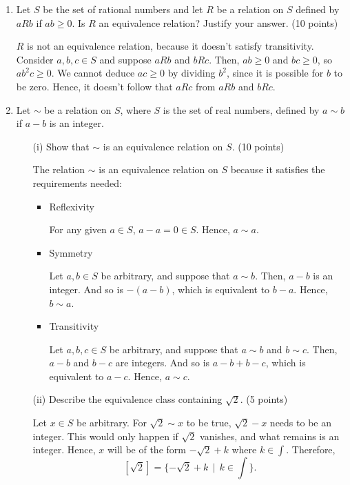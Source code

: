\begin{enumerate}
    \item Let \(S\) be the set of rational numbers and let \(R\) be a relation on \(S\) defined by \(aRb\) if \(ab \geq 0\). Is \(R\) an equivalence relation? Justify your answer. (10 points)

    \(R\) is not an equivalence relation, because it doesn't satisfy transitivity. Consider \(a,b,c\in S\) and suppose \(aRb\) and \(bRc\). Then, \(ab \geq 0\) and \(bc \geq 0\), so \(ab^2c \geq 0\). We cannot deduce \(ac \geq 0\) by dividing \(b^2\), since it is possible for \(b\) to be zero. Hence, it doesn't follow that \(aRc\) from \(aRb\) and \(bRc\).

    \item Let \(\sim\) be a relation on \(S\), where \(S\) is the set of real numbers, defined by \(a \sim b\) if \(a - b\) is an integer.
    \begin{enumerate}
        \item[(i)] Show that \(\sim\) is an equivalence relation on \(S\). (10 points)

        The relation \(\sim\) is an equivalence relation on \(S\) because it satisfies the requirements needed:
        \begin{itemize}
            \item Reflexivity

            For any given \(a\in S\), \(a - a = 0\in S\). Hence, \(a \sim a\).

            \item Symmetry

            Let \(a,b\in S\) be arbitrary, and suppose that \(a \sim b\). Then, \(a - b\) is an integer. And so is \(-(a - b)\), which is equivalent to \(b - a\). Hence, \(b \sim a\).

            \item Transitivity

            Let \(a,b,c\in S\) be arbitrary, and suppose that \(a \sim b\) and \(b \sim c\). Then, \(a - b\) and \(b - c\) are integers. And so is \(a - b + b - c\), which is equivalent to \(a - c\). Hence, \(a \sim c\).
        \end{itemize}

        \item[(ii)] Describe the equivalence class containing \(\sqrt{2}\). (5 points)

        Let \(x\in S\) be arbitrary. For \(\sqrt{2} \sim x\) to be true, \(\sqrt{2} - x\) needs to be an integer. This would only happen if \(\sqrt{2}\) vanishes, and what remains is an integer. Hence, \(x\) will be of the form \(-\sqrt{2} + k\) where \(k\in \int\). Therefore, \[
            [\sqrt{2}] = \{-\sqrt{2} + k \,\mid\, k\in\int\}.
        \]


\end{enumerate}
\end{enumerate}

